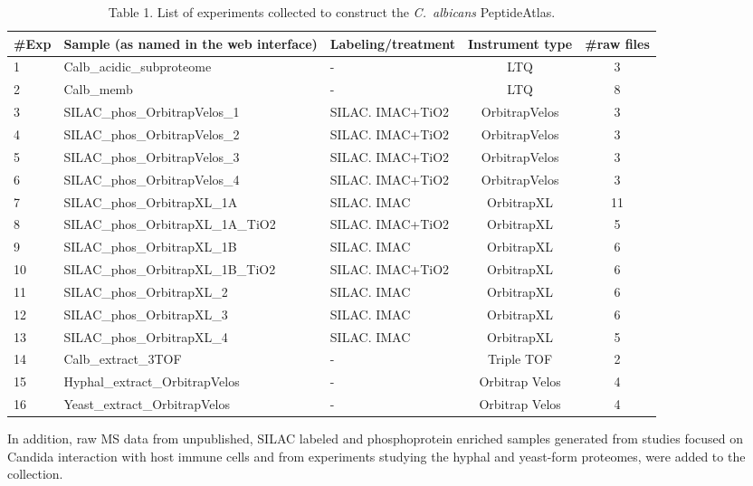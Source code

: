 \begin{table}[t]
\caption*{Table 1. List of experiments collected to construct the \textit{\mbox{C. albicans}} PeptideAtlas.}
\renewcommand{\arraystretch}{1.5}
\footnotesize
\centering
\begin{tabular}{l p{4cm} p{2cm} c c }
\hline
\#Exp & Sample \newline{} (as named in the web interface) & Labeling/treatment & Instrument type & \#raw files\\
\hline
1 & Calb\_acidic\_subproteome & - & LTQ & 3\\
2 & Calb\_memb & - & LTQ & 8\\
3 & SILAC\_phos\_OrbitrapVelos\_1 & SILAC. IMAC+TiO2 & OrbitrapVelos & 3\\
4 & SILAC\_phos\_OrbitrapVelos\_2 & SILAC. IMAC+TiO2 & OrbitrapVelos & 3\\
5 & SILAC\_phos\_OrbitrapVelos\_3 & SILAC. IMAC+TiO2 & OrbitrapVelos & 3\\
6 & SILAC\_phos\_OrbitrapVelos\_4 & SILAC. IMAC+TiO2 & OrbitrapVelos & 3\\
7 & SILAC\_phos\_OrbitrapXL\_1A & SILAC. IMAC & OrbitrapXL & 11\\
8 & SILAC\_phos\_OrbitrapXL\_1A\_TiO2 & SILAC. IMAC+TiO2 & OrbitrapXL & 5\\
9 & SILAC\_phos\_OrbitrapXL\_1B & SILAC. IMAC & OrbitrapXL & 6\\
10 & SILAC\_phos\_OrbitrapXL\_1B\_TiO2 & SILAC. IMAC+TiO2 & OrbitrapXL & 6\\
11 & SILAC\_phos\_OrbitrapXL\_2 & SILAC. IMAC & OrbitrapXL & 6\\
12 & SILAC\_phos\_OrbitrapXL\_3 & SILAC. IMAC & OrbitrapXL & 6\\
13 & SILAC\_phos\_OrbitrapXL\_4 & SILAC. IMAC & OrbitrapXL & 5\\
14 & Calb\_extract\_3TOF & - & Triple TOF & 2\\
15 & Hyphal\_extract\_OrbitrapVelos & - & Orbitrap Velos & 4\\
16 & Yeast\_extract\_OrbitrapVelos & - & Orbitrap Velos & 4\\
\end{tabular}
\end{table}


 

In addition, raw MS data from unpublished, SILAC labeled
and phosphoprotein enriched samples generated from studies
focused on Candida interaction with host immune cells and from
experiments studying the hyphal and yeast-form proteomes,
were added to the collection.



